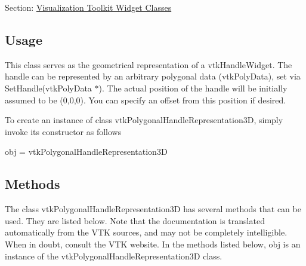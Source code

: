 Section\-: \hyperlink{sec_vtkwidgets}{Visualization Toolkit Widget Classes} \hypertarget{vtkwidgets_vtkxyplotwidget_Usage}{}\subsection{Usage}\label{vtkwidgets_vtkxyplotwidget_Usage}
This class serves as the geometrical representation of a vtk\-Handle\-Widget. The handle can be represented by an arbitrary polygonal data (vtk\-Poly\-Data), set via Set\-Handle(vtk\-Poly\-Data $\ast$). The actual position of the handle will be initially assumed to be (0,0,0). You can specify an offset from this position if desired.

To create an instance of class vtk\-Polygonal\-Handle\-Representation3\-D, simply invoke its constructor as follows \begin{DoxyVerb}  obj = vtkPolygonalHandleRepresentation3D
\end{DoxyVerb}
 \hypertarget{vtkwidgets_vtkxyplotwidget_Methods}{}\subsection{Methods}\label{vtkwidgets_vtkxyplotwidget_Methods}
The class vtk\-Polygonal\-Handle\-Representation3\-D has several methods that can be used. They are listed below. Note that the documentation is translated automatically from the V\-T\-K sources, and may not be completely intelligible. When in doubt, consult the V\-T\-K website. In the methods listed below, {\ttfamily obj} is an instance of the vtk\-Polygonal\-Handle\-Representation3\-D class. 
